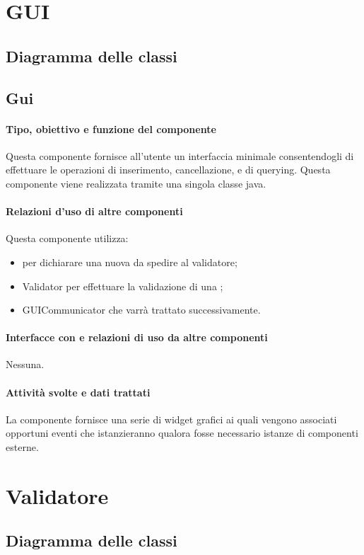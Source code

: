 \documentclass[11pt,titlepage,a4paper]{report}
\begin{document}
\section{GUI}
\subsection{Diagramma delle classi}
\subsection{Gui}
\paragraph{Tipo, obiettivo e funzione del componente}
Questa componente fornisce all'utente un interfaccia minimale consentendogli di effettuare le operazioni di inserimento, cancellazione, e di querying.
Questa componente viene realizzata tramite una singola classe java.
\paragraph{Relazioni d'uso di altre componenti}
Questa componente utilizza:
\begin{itemize}
 \item \BR per dichiarare una nuova \br da spedire al validatore;
 \item Validator per effettuare la validazione di una \br;
 \item GUICommunicator che varr\`a trattato successivamente.
\end{itemize}
\paragraph{Interfacce con e relazioni di uso da altre componenti}
Nessuna.
\paragraph{Attivit\`a svolte e dati trattati}
La componente fornisce una serie di widget grafici ai quali vengono associati opportuni eventi che istanzieranno qualora fosse necessario istanze di componenti esterne.%

\section{Validatore}
\subsection{Diagramma delle classi}
\end{document}
